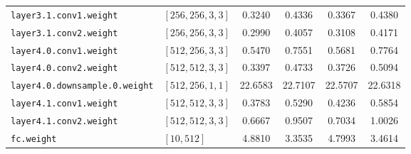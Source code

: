 \documentclass{article}
\begin{document}
\begin{table}[h]
\begin{tabular}{llcccc}
\texttt{layer3.1.conv1.weight} & $[256, 256, 3, 3]$ & 0.3240 & 0.4336 & 0.3367 & 0.4380 \\
\texttt{layer3.1.conv2.weight} & $[256, 256, 3, 3]$ & 0.2990 & 0.4057 & 0.3108 & 0.4171 \\
\texttt{layer4.0.conv1.weight} & $[512, 256, 3, 3]$ & 0.5470 & 0.7551 & 0.5681 & 0.7764 \\
\texttt{layer4.0.conv2.weight} & $[512, 512, 3, 3]$ & 0.3397 & 0.4733 & 0.3726 & 0.5094 \\
\texttt{layer4.0.downsample.0.weight} & $[512, 256, 1, 1]$ & 22.6583 & 22.7107 & 22.5707 & 22.6318 \\
\texttt{layer4.1.conv1.weight} & $[512, 512, 3, 3]$ & 0.3783 & 0.5290 & 0.4236 & 0.5854 \\
\texttt{layer4.1.conv2.weight} & $[512, 512, 3, 3]$ & 0.6667 & 0.9507 & 0.7034 & 1.0026 \\
\texttt{fc.weight} & $[10, 512]$ & 4.8810 & 3.3535 & 4.7993 & 3.4614 \\
\bottomrule
\end{tabular}
\end{table}
\end{document}

